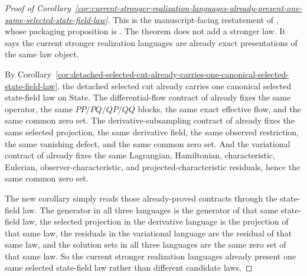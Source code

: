 \begin{proof}[Proof of Corollary~\ref{cor:current-stronger-realization-languages-already-present-one-same-selected-state-field-law}]
\label{proof:cor:current-stronger-realization-languages-already-present-one-same-selected-state-field-law}
This is the manuscript-facing restatement of
,
whose packaging proposition is
. The theorem does
not add a stronger law. It says the current stronger realization languages are
already exact presentations of the same law object.

By Corollary~\ref{cor:detached-selected-cut-already-carries-one-canonical-selected-state-field-law},
the detached selected cut already carries one canonical selected state-field
law on \(\mathrm{State}\). The differential-flow contract of
already fixes the same operator, the same \(PP/PQ/QP/QQ\) blocks, the same
exact effective flow, and the same common zero set. The derivative-subsampling
contract of
already fixes the same selected projection, the same derivative field, the
same observed restriction, the same vanishing defect, and the same common zero
set. And the variational contract of
already fixes the same Lagrangian, Hamiltonian, characteristic, Eulerian,
observer-characteristic, and projected-characteristic residuals, hence the
same common zero set.

The new corollary simply reads those already-proved contracts through the
state-field law. The generator in all three languages is the generator of that
same state-field law, the selected projection in the derivative language is
the projection of that same law, the residuals in the variational language are
the residual of that same law, and the solution sets in all three languages
are the same zero set of that same law. So the current stronger realization
languages already present one same selected state-field law rather than
different candidate laws.
\end{proof}

